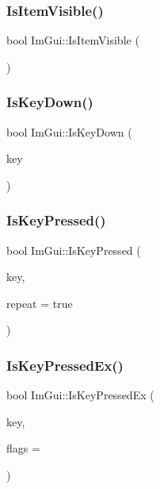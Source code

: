 \subsubsection{\texorpdfstring{Is\+Item\+Visible()}{IsItemVisible()}}
{\footnotesize\ttfamily bool Im\+Gui\+::\+Is\+Item\+Visible (\begin{DoxyParamCaption}{ }\end{DoxyParamCaption})}

\mbox{\label{namespaceImGui_a82095f2501c1df5ccd1928a53edaad99}} 
\subsubsection{\texorpdfstring{Is\+Key\+Down()}{IsKeyDown()}}
{\footnotesize\ttfamily bool Im\+Gui\+::\+Is\+Key\+Down (\begin{DoxyParamCaption}\item[{\hyperlink{imgui_8h_aa22ffe36b188427d712447ec465203d4}{Im\+Gui\+Key}}]{key }\end{DoxyParamCaption})}

\mbox{\label{namespaceImGui_a477c2ef31c9641b158d78879780bd108}} 
\subsubsection{\texorpdfstring{Is\+Key\+Pressed()}{IsKeyPressed()}}
{\footnotesize\ttfamily bool Im\+Gui\+::\+Is\+Key\+Pressed (\begin{DoxyParamCaption}\item[{\hyperlink{imgui_8h_aa22ffe36b188427d712447ec465203d4}{Im\+Gui\+Key}}]{key,  }\item[{bool}]{repeat = {\ttfamily true} }\end{DoxyParamCaption})}

\mbox{\label{namespaceImGui_a85f5794cc1f68ada90642750e001f37a}} 
\subsubsection{\texorpdfstring{Is\+Key\+Pressed\+Ex()}{IsKeyPressedEx()}}
{\footnotesize\ttfamily bool Im\+Gui\+::\+Is\+Key\+Pressed\+Ex (\begin{DoxyParamCaption}\item[{\hyperlink{imgui_8h_aa22ffe36b188427d712447ec465203d4}{Im\+Gui\+Key}}]{key,  }\item[{\hyperlink{imgui__internal_8h_aa4211ddd58ae8523981eb953a1caf4b7}{Im\+Gui\+Input\+Flags}}]{flags = {} }\end{DoxyParamCaption})}

